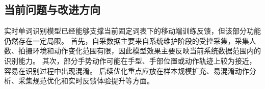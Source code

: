 
\subsection{当前问题与改进方向}

实时单词识别模型已经能够支撑当前固定词表下的移动端训练反馈，但该部分功能仍然存在一定局限。
首先，自采数据主要来自系统维护阶段的受控采集，采集人数、拍摄环境和动作变化范围有限，因此模型效果主要反映当前系统数据范围内的识别能力。
其次，部分手势动作可能在手型、手部位置或动作轨迹上较为接近，容易在识别过程中出现混淆。
后续优化重点应放在样本规模扩充、易混淆动作分析、采集规范优化和实时反馈体验提升等方面。
